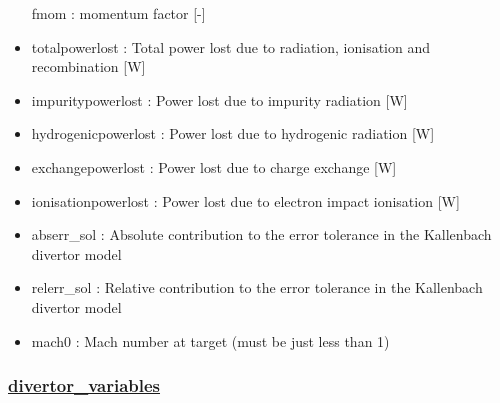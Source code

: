 \documentclass[]{article}
\begin{document}
\begin{itemize}
  fmom : momentum factor {[}-{]}
\item
  totalpowerlost : Total power lost due to radiation, ionisation and
  recombination {[}W{]}
\item
  impuritypowerlost : Power lost due to impurity radiation {[}W{]}
\item
  hydrogenicpowerlost : Power lost due to hydrogenic radiation {[}W{]}
\item
  exchangepowerlost : Power lost due to charge exchange {[}W{]}
\item
  ionisationpowerlost : Power lost due to electron impact ionisation
  {[}W{]}
\item
  abserr\_sol : Absolute contribution to the error tolerance in the
  Kallenbach divertor model
\item
  relerr\_sol : Relative contribution to the error tolerance in the
  Kallenbach divertor model
\item
  mach0 : Mach number at target (must be just less than 1)
\end{itemize}

\subsubsection{\href{divertor_variables.html}{divertor\_variables}}
\end{document}
